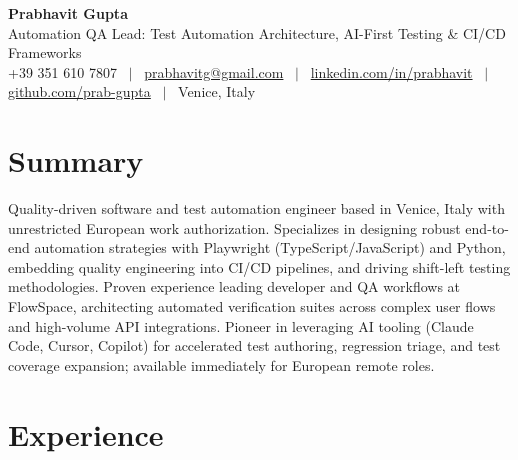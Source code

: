 \documentclass[a4paper,10pt]{article}
\begin{document}
\begin{minipage}[c]{0.80\textwidth}
 {\Huge\bfseries Prabhavit Gupta}\\[3pt]
 {\color{accent}\large Automation QA Lead: Test Automation Architecture, AI-First Testing \& CI/CD Frameworks}\\[6pt]
 {\footnotesize +39 351 610 7807 ~$\vert$~
 \href{mailto:prabhavitg@gmail.com}{prabhavitg@gmail.com} ~$\vert$~
 \href{https://www.linkedin.com/in/prabhavit/}{linkedin.com/in/prabhavit} ~$\vert$~
 \href{https://github.com/prab-gupta}{github.com/prab-gupta} ~$\vert$~
 Venice, Italy}
\end{minipage}\hfill

\section{Summary}
Quality-driven software and test automation engineer based in Venice, Italy with unrestricted European work authorization. Specializes in designing robust end-to-end automation strategies with Playwright (TypeScript/JavaScript) and Python, embedding quality engineering into CI/CD pipelines, and driving shift-left testing methodologies. Proven experience leading developer and QA workflows at FlowSpace, architecting automated verification suites across complex user flows and high-volume API integrations. Pioneer in leveraging AI tooling (Claude Code, Cursor, Copilot) for accelerated test authoring, regression triage, and test coverage expansion; available immediately for European remote roles.

\section{Experience}
\end{document}
